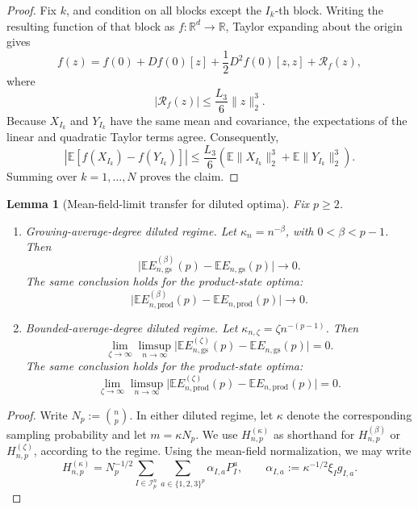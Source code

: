\documentclass[12pt]{article}
\newtheorem{lemma}[theorem]{Lemma}
\newcommand{\E}{\mathbb{E}}
\newcommand{\R}{\mathbb{R}}
\newcommand{\mcI}{\mathcal{I}}
\begin{document}
\begin{appendix}
\begin{proof}
Fix \(k\), and condition on all blocks except the \(I_k\)-th block.
Writing the resulting function of that block as \(f:\R^d\to\R\), Taylor expanding about the origin gives
\[
    f(z)
    =
    f(0)
    +
    Df(0)[z]
    +
    \frac12D^2f(0)[z,z]
    +
    \mathcal R_f(z),
\]
where
\[
    |\mathcal R_f(z)|
    \le
    \frac{L_3}{6}\|z\|_2^3.
\]
Because \(X_{I_k}\) and \(Y_{I_k}\) have the same mean and covariance,
the expectations of the linear and quadratic Taylor terms agree.
Consequently,
\[
    \left|
        \E\left[
            f(X_{I_k})-f(Y_{I_k})
        \right]
    \right|
    \le
    \frac{L_3}{6}
    \left(
        \E\|X_{I_k}\|_2^3
        +
        \E\|Y_{I_k}\|_2^3
    \right).
\]
Summing over \(k=1,\ldots,N\) proves the claim.
\end{proof}


\begin{lemma}[Mean-field-limit transfer for diluted optima]
\label{lem:mean-field-limit-transfer}
Fix \(p\ge2\).

\begin{enumerate}
\item[\textup{(i)}] \textup{Growing-average-degree diluted regime.}
Let \(\kappa_n=n^{-\beta}\), with \(0<\beta<p-1\). Then
\[
\big|
\E E_{n,\mathrm{gs}}^{(\beta)}(p)
-
\E E_{n,\mathrm{gs}}(p)
\big|
\to0 .
\]
The same conclusion holds for the product-state optima:
\[
\big|
\E E_{n,\mathrm{prod}}^{(\beta)}(p)
-
\E E_{n,\mathrm{prod}}(p)
\big|
\to0 .
\]

\item[\textup{(ii)}] \textup{Bounded-average-degree diluted regime.}
Let \(\kappa_{n,\zeta}=\zeta n^{-(p-1)}\). Then
\[
\lim_{\zeta\to\infty}
\limsup_{n\to\infty}
\big|
\E E_{n,\mathrm{gs}}^{(\zeta)}(p)
-
\E E_{n,\mathrm{gs}}(p)
\big|
=0 .
\]
The same conclusion holds for the product-state optima:
\[
\lim_{\zeta\to\infty}
\limsup_{n\to\infty}
\big|
\E E_{n,\mathrm{prod}}^{(\zeta)}(p)
-
\E E_{n,\mathrm{prod}}(p)
\big|
=0 .
\]
\end{enumerate}
\end{lemma}


\begin{proof}
Write \(N_p:=\binom np\). In either diluted regime, let \(\kappa\) denote
the corresponding sampling probability and let \(m=\kappa N_p\). We use
\(H_{n,p}^{(\kappa)}\) as shorthand for \(H_{n,p}^{(\beta)}\) or
\(H_{n,p}^{(\zeta)}\), according to the regime. Using the mean-field
normalization, we may write
\[
    H_{n,p}^{(\kappa)}
    =
    N_p^{-1/2}
    \sum_{I\in\mcI_p^n}
    \sum_{a\in\{1,2,3\}^p}
    \alpha_{I,a}P_I^a,
    \qquad
    \alpha_{I,a}:=\kappa^{-1/2}\xi_I g_{I,a}.
\]


\end{proof}
\end{appendix}
\end{document}
